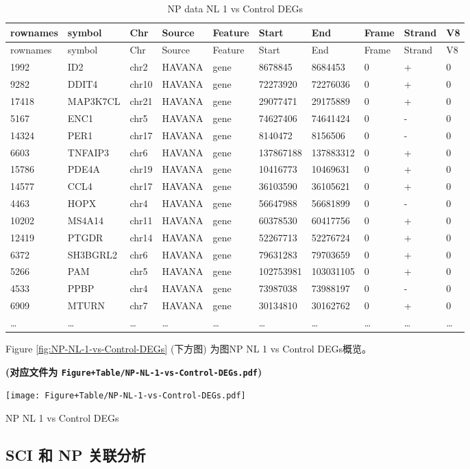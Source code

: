 \documentclass[
]{article}
\begin{document}
\begin{longtable}[]{@{}llllllllll@{}}
\caption{\label{tab:NP-data-NL-1-vs-Control-DEGs}NP data NL 1 vs Control DEGs}\tabularnewline
\toprule
rownames & symbol & Chr & Source & Feature & Start & End & Frame & Strand & V8\tabularnewline
\midrule
\endfirsthead
\toprule
rownames & symbol & Chr & Source & Feature & Start & End & Frame & Strand & V8\tabularnewline
\midrule
\endhead
1992 & ID2 & chr2 & HAVANA & gene & 8678845 & 8684453 & 0 & + & 0\tabularnewline
9282 & DDIT4 & chr10 & HAVANA & gene & 72273920 & 72276036 & 0 & + & 0\tabularnewline
17418 & MAP3K7CL & chr21 & HAVANA & gene & 29077471 & 29175889 & 0 & + & 0\tabularnewline
5167 & ENC1 & chr5 & HAVANA & gene & 74627406 & 74641424 & 0 & - & 0\tabularnewline
14324 & PER1 & chr17 & HAVANA & gene & 8140472 & 8156506 & 0 & - & 0\tabularnewline
6603 & TNFAIP3 & chr6 & HAVANA & gene & 137867188 & 137883312 & 0 & + & 0\tabularnewline
15786 & PDE4A & chr19 & HAVANA & gene & 10416773 & 10469631 & 0 & + & 0\tabularnewline
14577 & CCL4 & chr17 & HAVANA & gene & 36103590 & 36105621 & 0 & + & 0\tabularnewline
4463 & HOPX & chr4 & HAVANA & gene & 56647988 & 56681899 & 0 & - & 0\tabularnewline
10202 & MS4A14 & chr11 & HAVANA & gene & 60378530 & 60417756 & 0 & + & 0\tabularnewline
12419 & PTGDR & chr14 & HAVANA & gene & 52267713 & 52276724 & 0 & + & 0\tabularnewline
6372 & SH3BGRL2 & chr6 & HAVANA & gene & 79631283 & 79703659 & 0 & + & 0\tabularnewline
5266 & PAM & chr5 & HAVANA & gene & 102753981 & 103031105 & 0 & + & 0\tabularnewline
4533 & PPBP & chr4 & HAVANA & gene & 73987038 & 73988197 & 0 & - & 0\tabularnewline
6909 & MTURN & chr7 & HAVANA & gene & 30134810 & 30162762 & 0 & + & 0\tabularnewline
\ldots{} & \ldots{} & \ldots{} & \ldots{} & \ldots{} & \ldots{} & \ldots{} & \ldots{} & \ldots{} & \ldots{}\tabularnewline
\bottomrule
\end{longtable}

Figure \ref{fig:NP-NL-1-vs-Control-DEGs} (下方图) 为图NP NL 1 vs Control DEGs概览。

\textbf{(对应文件为 \texttt{Figure+Table/NP-NL-1-vs-Control-DEGs.pdf})}

\def\@captype{figure}
\begin{center}
\texttt{[image: Figure+Table/NP-NL-1-vs-Control-DEGs.pdf]}
\caption{NP NL 1 vs Control DEGs}\label{fig:NP-NL-1-vs-Control-DEGs}
\end{center}

\hypertarget{sci-ux548c-np-ux5173ux8054ux5206ux6790-1}{%
\subsection{SCI 和 NP 关联分析}\label{sci-ux548c-np-ux5173ux8054ux5206ux6790-1}}
\end{document}
